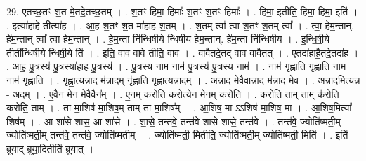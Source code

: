 \documentclass[17pt]{extarticle}
\begin{document}
29. ए॒तच्छ॒तꣳ श॒त मे॒तदे॒तच्छ॒तम् । . श॒तꣳ हिमा॒ हिमाः᳚ श॒तꣳ श॒तꣳ हिमाः᳚ । . हिमा॒ इतीति॒ हिमा॒ हिमा॒ इति॑ । . इत्या॑हा॒हे तीत्या॑ह । . आ॒ह॒ श॒तꣳ श॒त मा॑हाह श॒तम् । . श॒तम् त्वा᳚ त्वा श॒तꣳ श॒तम् त्वा᳚ । . त्वा॒ हे॒म॒न्तान्. हे॑म॒न्तान् त्वा᳚ त्वा हेम॒न्तान् । . हे॒म॒न्ता नि॑न्धिषीये न्धिषीय हेम॒न्तान्. हे॑म॒न्ता नि॑न्धिषीय । . इ॒न्धि॒षी॒ये तीती᳚न्धिषीये न्धिषी॒ये ति॑ । . इति॒ वाव वावे तीति॒ वाव । . वावैतदे॒तद् वाव वावैतत् । . ए॒तदा॑हाहै॒तदे॒तदा॑ह । . आ॒ह॒ पु॒त्रस्य॑ पु॒त्रस्या॑हाह पु॒त्रस्य॑ । . पु॒त्रस्य॒ नाम॒ नाम॑ पु॒त्रस्य॑ पु॒त्रस्य॒ नाम॑ । . नाम॑ गृह्णाति गृह्णाति॒ नाम॒ नाम॑ गृह्णाति । . गृ॒ह्णा॒त्य॒न्ना॒द म॑न्ना॒दम् गृ॑ह्णाति गृह्णात्यन्ना॒दम् । . अ॒न्ना॒द मे॒वैवान्ना॒द म॑न्ना॒द मे॒व । . अ॒न्ना॒दमित्य॑न्न - अ॒दम् । . ए॒वैन॑ मेन मे॒वैवैन᳚म् । . ए॒न॒म् क॒रो॒ति॒ क॒रो॒त्ये॒न॒ मे॒न॒म् क॒रो॒ति॒ । . क॒रो॒ति॒ ताम् ताम् क॑रोति करोति॒ ताम् । . ता मा॒शिष॑ मा॒शिष॒म् ताम् ता मा॒शिष᳚म् । . आ॒शिष॒ मा ऽऽशिष॑ मा॒शिष॒ मा । . आ॒शिष॒मित्या᳚ - शिष᳚म् । . आ शा॑से शास॒ आ शा॑से । . शा॒से॒ तन्त॑वे॒ तन्त॑वे शासे शासे॒ तन्त॑वे । . तन्त॑वे॒ ज्योति॑ष्मती॒म् ज्योति॑ष्मती॒म् तन्त॑वे॒ तन्त॑वे॒ ज्योति॑ष्मतीम् । . ज्योति॑ष्मती॒ मितीति॒ ज्योति॑ष्मती॒म् ज्योति॑ष्मती॒ मिति॑ । . इति॑ ब्रूयाद् ब्रूया॒दितीति॑ ब्रूयात् । \newline
\end{document}
